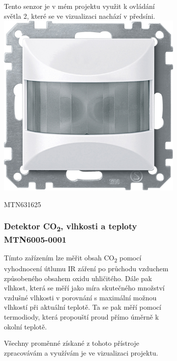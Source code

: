 \documentclass[12pt, a4paper,
twoside,        %
openright
]{report}
\begin{document}
\begin{figure}[h]
\begin{subfigure}{0.9\textwidth}
	\noindent Tento senzor je v mém projektu využit k ovládání světla 2, které se ve vizualizaci nachází v předsíni.
		\centering
		\includegraphics[scale=0.1]{image/MTN631625.jpg}
		\caption{MTN631625}
		\label{image:12}
\end{subfigure}

\begin{subfigure}{0.9\textwidth}
	\subsubsection{Detektor \texorpdfstring{CO\textsubscript{2}},, vlhkosti a teploty MTN6005-0001}
	Tímto zařízením lze měřit obsah \texorpdfstring{CO\textsubscript{2}},  pomocí vyhodnocení útlumu IR záření po průchodu vzduchem způsobeného obsahem oxidu uhličitého. Dále pak vlhkost, která se měří jako míra skutečného množství vzdušné vlhkosti v porovnání s maximální možnou vlhkostí při aktuální teplotě. Ta se pak měří pomocí termodiody, která propouští proud přímo úměrně k okolní teplotě.

	\noindent Všechny proměnné získané z tohoto přístroje zpracovávám a využívám je ve vizualizaci projektu.



\end{subfigure}
\end{figure}
\end{document}
